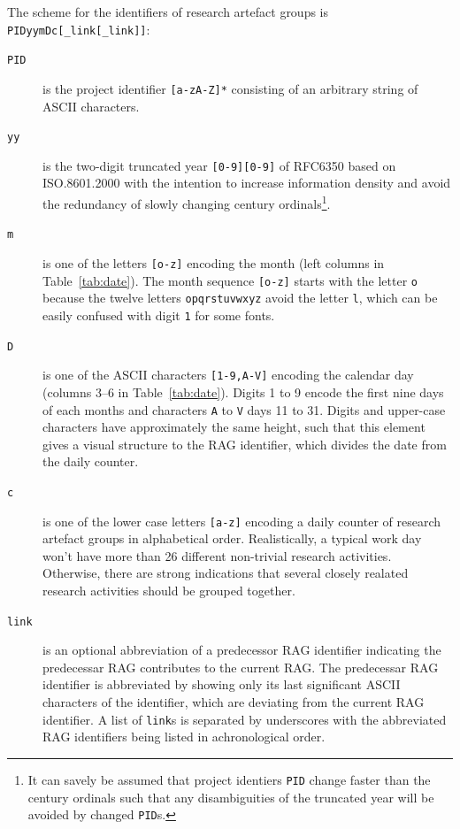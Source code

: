 \documentclass{report}
\begin{document}
The scheme for the identifiers of research artefact groups is \texttt{PIDyymDc[\_link[\_link]]}:
\begin{description}
\item[{\texttt{PID}}] is the project identifier  \texttt{[a-zA-Z]*} consisting of an arbitrary string of ASCII characters. 
\item[{\texttt{yy}}] is the two-digit truncated year \texttt{[0-9][0-9]} of RFC6350 \cite[p. 12]{Perreault2011_vCard} based on ISO.8601.2000 with the intention to increase information density and avoid the redundancy of slowly changing century ordinals\footnote{It can savely be assumed that project identiers \texttt{PID} change faster than the century ordinals such that any disambiguities of the truncated year will be avoided by changed \texttt{PID}s.}. 
\item[{\texttt{m}}] is one of the letters \texttt{[o-z]} encoding the month (left columns in Table~\ref{tab:date}). The month sequence \texttt{[o-z]} starts with the letter \texttt{o} because the twelve letters \texttt{opqrstuvwxyz} avoid the letter \texttt{l}, which can be easily confused with digit \texttt{1} for some fonts.
\item[{\texttt{D}}] is one of the ASCII characters \texttt{[1-9,A-V]} encoding the calendar day (columns 3--6 in Table~\ref{tab:date}). Digits 1 to 9 encode the first nine days of each months and characters \texttt{A} to \texttt{V} days 11 to 31. Digits and upper-case characters have approximately the same height, such that this element gives a visual structure to the RAG identifier, which divides the date from the daily counter.
\item[{\texttt{c}}] is one of the lower case letters \texttt{[a-z]} encoding a daily counter of research artefact groups in alphabetical order. Realistically, a typical work day won't have more than 26 different non-trivial research activities. Otherwise, there are strong indications that several closely realated research activities should be grouped together.
\item[{\texttt{link}}] is an optional abbreviation of a predecessor RAG identifier indicating the predecessar RAG contributes to the current RAG. The predecessar RAG identifier is abbreviated by showing only its last significant ASCII characters of the identifier, which are deviating from the current RAG identifier. A list of \texttt{link}s is separated by underscores with the abbreviated RAG identifiers  being listed in achronological order.
\end{description}
 
\end{document}
